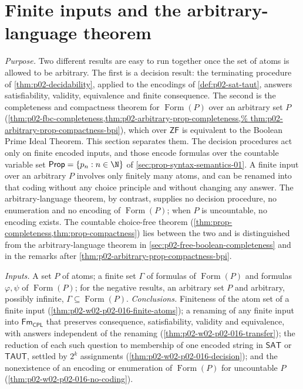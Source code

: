 \section{Finite inputs and the arbitrary-language theorem}
\label{sec:p02-w02-p02-016-finite-input-scope}

\emph{Purpose.}  Two different results are easy to run together once the set
of atoms is allowed to be arbitrary.  The first is a decision result: the
terminating procedure of \cref{thm:p02-decidability}, applied to the
encodings of \cref{def:p02-sat-taut}, answers satisfiability, validity,
equivalence and finite consequence.  The second is the completeness and
compactness theorem for \(\operatorname{Form}(P)\) over an arbitrary set
\(P\) (\cref{thm:p02-fbc-completeness,thm:p02-arbitrary-prop-completeness,%
thm:p02-arbitrary-prop-compactness-bpi}), which over \(\mathsf{ZF}\) is
equivalent to the Boolean Prime Ideal Theorem.  This section separates them.
The decision procedures act only on finite encoded inputs, and those encode
formulas over the countable variable set
\(\mathsf{Prop}=\{p_n:n\in\N\}\) of \cref{sec:prop-syntax-semantics-01}.
A finite input over an arbitrary \(P\) involves only finitely many atoms, and
can be renamed into that coding without any choice principle and without
changing any answer.  The arbitrary-language theorem, by contrast, supplies
no decision procedure, no enumeration and no encoding of
\(\operatorname{Form}(P)\); when \(P\) is uncountable, no encoding exists.
The countable choice-free theorem
(\cref{thm:prop-completeness,thm:prop-compactness}) lies between the two and
is distinguished from the arbitrary-language theorem in
\cref{sec:p02-free-boolean-completeness} and in the remarks after
\cref{thm:p02-arbitrary-prop-compactness-bpi}.

\emph{Inputs.}  A set \(P\) of atoms; a finite set \(\Gamma\) of formulas of
\(\operatorname{Form}(P)\) and formulas \(\varphi,\psi\) of
\(\operatorname{Form}(P)\); for the negative results, an arbitrary set
\(P\) and arbitrary, possibly infinite, \(\Gamma\subseteq\operatorname{Form}(P)\).
\emph{Conclusions.}  Finiteness of the atom set of a finite input
(\cref{thm:p02-w02-p02-016-finite-atoms}); a renaming of any finite input
into \(\mathsf{Fm}_{\mathsf{CPL}}\) that preserves consequence,
satisfiability, validity and equivalence, with answers independent of the
renaming (\cref{thm:p02-w02-p02-016-transfer}); the reduction of each such
question to membership of one encoded string in \(\mathsf{SAT}\) or
\(\mathsf{TAUT}\), settled by \(2^k\) assignments
(\cref{thm:p02-w02-p02-016-decision}); and the nonexistence of an encoding or
enumeration of \(\operatorname{Form}(P)\) for uncountable \(P\)
(\cref{thm:p02-w02-p02-016-no-coding}).

